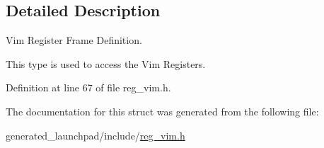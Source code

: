 \subsection{Detailed Description}
Vim Register Frame Definition. 

This type is used to access the Vim Registers. 

Definition at line 67 of file reg\+\_\+vim.\+h.



The documentation for this struct was generated from the following file\+:\begin{DoxyCompactItemize}
\item 
generated\+\_\+launchpad/include/\mbox{\hyperlink{reg__vim_8h}{reg\+\_\+vim.\+h}}\end{DoxyCompactItemize}
